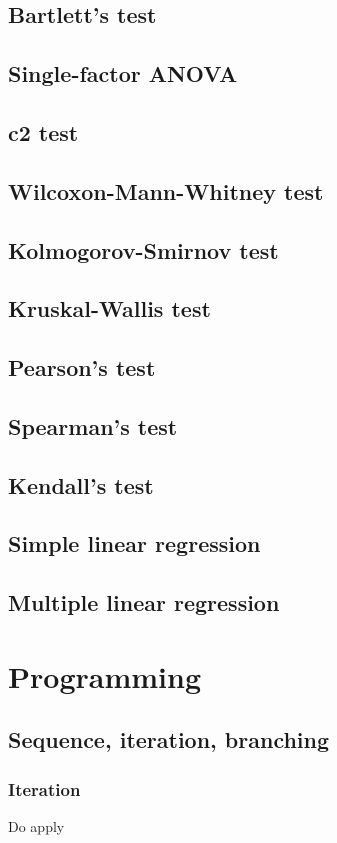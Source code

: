 \documentclass{report}
\begin{document}
	\section{Bartlett’s test}
	\section{Single-factor ANOVA}
	\section{c2 test}
	\section{Wilcoxon-Mann-Whitney test}
	\section{Kolmogorov-Smirnov test}
	\section{Kruskal-Wallis test}
	\section{Pearson’s test}
	\section{Spearman’s test}
	\section{Kendall’s test}
	\section{Simple linear regression}
	\section{Multiple linear regression}

\chapter{Programming}
	\section{Sequence, iteration, branching}
		\subsection{Iteration}\label{subsec:iteration}
		Do apply
		
\end{document}
